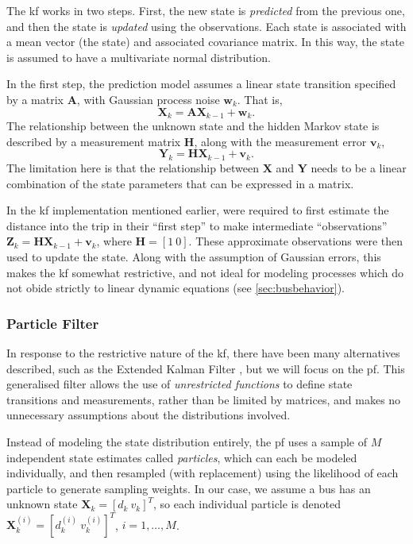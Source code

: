 \documentclass[12pt,a4paper]{article}
\newcommand{\bY}{\mathbf{Y}}
\newcommand{\bX}{\mathbf{X}}
\newcommand{\bZ}{\mathbf{Z}}
\newcommand{\mat}[1]{\mathbf{#1}}
\begin{document}
The \gls{kf} works in two steps.
First, the new state is \emph{predicted} from the previous one,
and then the state is \emph{updated} using the observations.
Each state is associated with a mean vector (the state) and associated covariance matrix.
In this way, the state is assumed to have a multivariate normal distribution.


In the first step, the prediction model assumes a linear state transition specified by
a matrix $\mat{A}$, with Gaussian process noise $\mat{w}_k$.
That is, 
\begin{equation}
  \label{eq:kf_statetransition}
  \bX_k = \mat{A}\bX_{k-1} + \mat{w}_k.
\end{equation}
The relationship between the unknown state and the hidden Markov state is described
by a measurement matrix $\mat{H}$, along with the measurement error $\mat{v}_k$,
\begin{equation}
  \label{eq:kf_measurement}
  \bY_k = \mat{H}\bX_{k-1} + \mat{v}_k.
\end{equation}
The limitation here is that the relationship between $\bX$ and $\bY$ needs to be a linear
combination of the state parameters that can be expressed in a matrix.


In the \gls{kf} implementation mentioned earlier,
\cite{cathey-dailey:2003} were required to first estimate the 
distance into the trip in their ``first step'' to make intermediate ``observations''
$\bZ_k = \mat{H}\bX_{k-1} + \mat{v}_k$, where $\mat{H} = [1\ 0]$.
These approximate observations were then used to update the state.
Along with the assumption of Gaussian errors,
this makes the \gls{kf} somewhat restrictive,
and not ideal for modeling processes which do not obide strictly to linear dynamic equations
(see \cref{sec:busbehavior}).



\subsubsection{Particle Filter}
\label{sec:particle_filter}

In response to the restrictive nature of the \gls{kf}, there have been many 
alternatives described, such as the Extended Kalman Filter \citep{cn},
but we will focus on the \gls{pf}.
This generalised filter allows the use of \emph{unrestricted functions} to define
state transitions and measurements, rather than be limited by matrices,
and makes no unnecessary assumptions about the distributions involved.


Instead of modeling the state distribution entirely, 
the \gls{pf} uses a sample of $M$ independent state estimates called \emph{particles}, 
which can each be modeled individually, and then resampled (with replacement) 
using the likelihood of each particle to generate sampling weights.
In our case, we assume a bus has an unknown state $\bX_k = [d_k\ v_k]^T$,
so each individual particle is denoted $\bX_k^{(i)} = [d_k^{(i)}\ v_k^{(i)}]^T$,
$i = 1, \ldots, M$.
\end{document}
